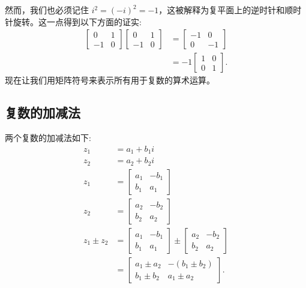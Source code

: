 然而，我们也必须记住 $i^{2}=(-i)^{2}=-1$，这被解释为复平面上的逆时针和顺时针旋转。这一点得到以下方面的证实:
$$
\begin{aligned}
{\left[\begin{array}{cc}
0 & 1 \\
-1 & 0
\end{array}\right]\left[\begin{array}{cc}
0 & 1 \\
-1 & 0
\end{array}\right] } & =\left[\begin{array}{cc}
-1 & 0 \\
0 & -1
\end{array}\right] \\
& =-1\left[\begin{array}{ll}
1 & 0 \\
0 & 1
\end{array}\right] .
\end{aligned}
$$
现在让我们用矩阵符号来表示所有用于复数的算术运算。

\subsection{复数的加减法}
两个复数的加减法如下:
$$
\begin{aligned}
z_{1} & =a_{1}+b_{1} i \\
z_{2} & =a_{2}+b_{2} i \\
z_{1} & =\left[\begin{array}{cc}
a_{1} & -b_{1} \\
b_{1} & a_{1}
\end{array}\right] \\
z_{2} & =\left[\begin{array}{cc}
a_{2} & -b_{2} \\
b_{2} & a_{2}
\end{array}\right] \\
z_{1} \pm z_{2} & =\left[\begin{array}{cc}
a_{1} & -b_{1} \\
b_{1} & a_{1}
\end{array}\right] \pm\left[\begin{array}{cc}
a_{2} & -b_{2} \\
b_{2} & a_{2}
\end{array}\right] \\
& =\left[\begin{array}{ll}
a_{1} \pm a_{2} & -\left(b_{1} \pm b_{2}\right) \\
b_{1} \pm b_{2} & a_{1} \pm a_{2}
\end{array}\right] .
\end{aligned}
$$

